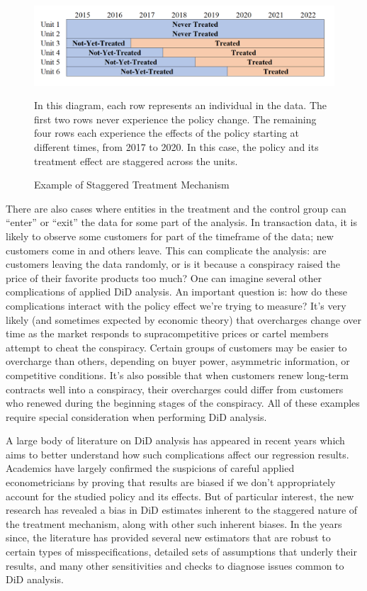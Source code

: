 \documentclass[12pt]{article}
\begin{document}
\begin{figure}[H]
    \centering
    \caption{Example of Staggered Treatment Mechanism}
    \includegraphics[width=6in]{Figures/Visual Staggered Treatment.PNG}
    \label{fig:visual}
    \vspace{2mm}
    \footnotesize \begin{singlespace*}
        \parbox{5.5in}{In this diagram, each row represents an individual in the data. The first two rows never experience the policy change. The remaining four rows each experience the effects of the policy starting at different times, from 2017 to 2020. In this case, the policy and its treatment effect are staggered across the units.}
    \end{singlespace*}
\end{figure}
\noindent There are also cases where entities in the treatment and the control group can “enter” or “exit” the data for some part of the analysis. In transaction data, it is likely to observe some customers for part of the timeframe of the data; new customers come in and others leave. This can complicate the analysis: are customers leaving the data randomly, or is it because a conspiracy raised the price of their favorite products too much?
One can imagine several other complications of applied DiD analysis. An important question is: how do these complications interact with the policy effect we’re trying to measure? It’s very likely (and sometimes expected by economic theory) that overcharges change over time as the market responds to supracompetitive prices or cartel members attempt to cheat the conspiracy. Certain groups of customers may be easier to overcharge than others, depending on buyer power, asymmetric information, or competitive conditions. It’s also possible that when customers renew long-term contracts well into a conspiracy, their overcharges could differ from customers who renewed during the beginning stages of the conspiracy. All of these examples require special consideration when performing DiD analysis.

A large body of literature on DiD analysis has appeared in recent years which aims to better understand how such complications affect our regression results. Academics have largely confirmed the suspicions of careful applied econometricians by proving that results are biased if we don’t appropriately account for the studied policy and its effects. But of particular interest, the new research has revealed a bias in DiD estimates inherent to the staggered nature of the treatment mechanism, along with other such inherent biases. In the years since, the literature has provided several new estimators that are robust to certain types of misspecifications, detailed sets of assumptions that underly their results, and many other sensitivities and checks to diagnose issues common to DiD analysis.
\end{document}
